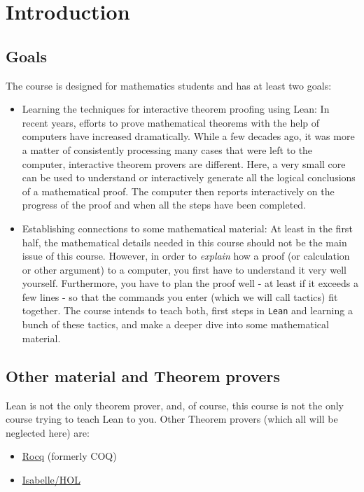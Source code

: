 \documentclass{memoir}
\begin{document}
\chapter{Introduction}



\section{Goals}

The course is designed for mathematics students and has at least two goals:

\begin{itemize}
\item Learning the techniques for interactive theorem proofing using Lean: In recent years, efforts to prove mathematical theorems with the help of computers have increased dramatically. While a few decades ago, it was more a matter of consistently processing many cases that were left to the computer, interactive theorem provers are different. Here, a very small core can be used to understand or interactively generate all the logical conclusions of a mathematical proof. The computer then reports interactively on the progress of the proof and when all the steps have been completed.\item Establishing connections to some mathematical material: At least in the first half, the mathematical details needed in this course should not be the main issue of this course. However, in order to \emph{explain} how a proof (or calculation or other argument) to a computer, you first have to understand it very well yourself. Furthermore, you have to plan the proof well - at least if it exceeds a few lines - so that the commands you enter (which we will call tactics) fit together. The course intends to teach both, first steps in \Verb|Lean| and learning a bunch of these tactics, and make a deeper dive into some mathematical material.
\end{itemize}




\section{Other material and Theorem provers}

Lean is not the only theorem prover, and, of course, this course is not the only course trying to teach Lean to you. Other Theorem provers (which all will be neglected here) are:

\begin{itemize}
\item \hyperlink{"https://rocq-prover.org/"}{Rocq} (formerly COQ)\item \hyperlink{"https://isabelle.in.tum.de/"}{Isabelle/HOL }
\end{itemize}
\end{document}

